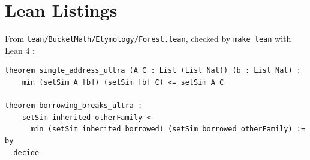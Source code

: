 \documentclass[11pt]{article}
\begin{document}

\section{Lean Listings}
\label{app:lean}

From \texttt{lean/BucketMath/Etymology/Forest.lean}, checked by
\texttt{make lean} with Lean 4 \autocite{demoura2021lean4}:

\begin{lstlisting}[style=bucketlean]
theorem single_address_ultra (A C : List (List Nat)) (b : List Nat) :
    min (setSim A [b]) (setSim [b] C) <= setSim A C

theorem borrowing_breaks_ultra :
    setSim inherited otherFamily <
      min (setSim inherited borrowed) (setSim borrowed otherFamily) := by
  decide
\end{lstlisting}
\end{document}
